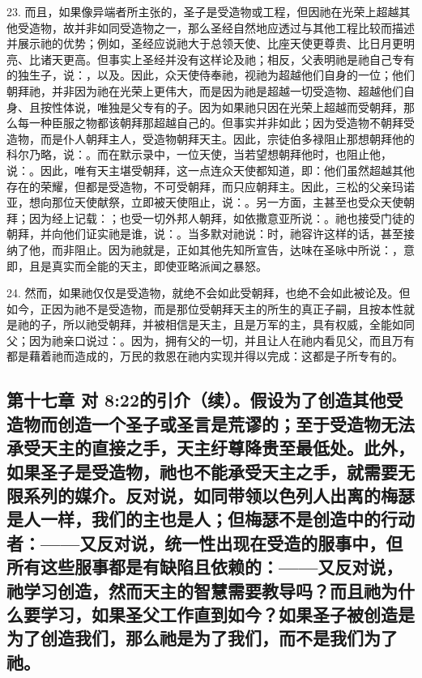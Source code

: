 23. 而且，如果像异端者所主张的，圣子是受造物或工程，但因祂在光荣上超越其他受造物，故并非如同受造物之一，那么圣经自然地应透过与其他工程比较而描述并展示祂的优势；例如，圣经应说祂大于总领天使、比座天使更尊贵、比日月更明亮、比诸天更高。但事实上圣经并没有这样论及祂；相反，父表明祂是祂自己专有的独生子，说：，以及。因此，众天使侍奉祂，视祂为超越他们自身的一位；他们朝拜祂，并非因为祂在光荣上更伟大，而是因为祂是超越一切受造物、超越他们自身、且按性体说，唯独是父专有的子。因为如果祂只因在光荣上超越而受朝拜，那么每一种臣服之物都该朝拜那超越自己的。但事实并非如此；因为受造物不朝拜受造物，而是仆人朝拜主人，受造物朝拜天主。因此，宗徒伯多禄阻止那想朝拜他的科尔乃略，说：。而在默示录中，一位天使，当若望想朝拜他时，也阻止他，说：。因此，唯有天主堪受朝拜，这一点连众天使都知道，即：他们虽然超越其他存在的荣耀，但都是受造物，不可受朝拜，而只应朝拜主。因此，三松的父亲玛诺亚，想向那位天使献祭，立即被天使阻止，说：。另一方面，主甚至也受众天使朝拜；因为经上记载：；也受一切外邦人朝拜，如依撒意亚所说：。祂也接受门徒的朝拜，并向他们证实祂是谁，说：。当多默对祂说：时，祂容许这样的话，甚至接纳了他，而非阻止。因为祂就是，正如其他先知所宣告，达味在圣咏中所说：，意即，且是真实而全能的天主，即使亚略派闻之暴怒。\par

24. 然而，如果祂仅仅是受造物，就绝不会如此受朝拜，也绝不会如此被论及。但如今，正因为祂不是受造物，而是那位受朝拜天主的所生的真正子嗣，且按本性就是祂的子，所以祂受朝拜，并被相信是天主，且是万军的主，具有权威，全能如同父；因为祂亲口说过：。因为，拥有父的一切，并且让人在祂内看见父，而且万有都是藉着祂而造成的，万民的救恩在祂内实现并得以完成：这都是子所专有的。\par


\subsection{第十七章 对 8:22的引介（续）。假设为了创造其他受造物而创造一个圣子或圣言是荒谬的；至于受造物无法承受天主的直接之手，天主纡尊降贵至最低处。此外，如果圣子是受造物，祂也不能承受天主之手，就需要无限系列的媒介。反对说，如同带领以色列人出离的梅瑟是人一样，我们的主也是人；但梅瑟不是创造中的行动者：——又反对说，统一性出现在受造的服事中，但所有这些服事都是有缺陷且依赖的：——又反对说，祂学习创造，然而天主的智慧需要教导吗？而且祂为什么要学习，如果圣父工作直到如今？如果圣子被创造是为了创造我们，那么祂是为了我们，而不是我们为了祂。}

